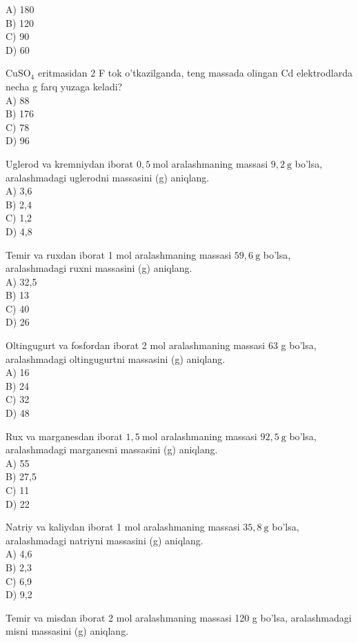 A) 180\\
B) 120\\
C) 90\\
D) 60
  \item $\mathrm{CuSO}_{4}$ eritmasidan 2 F tok o'tkazilganda, teng massada olingan Cd elektrodlarda necha g farq yuzaga keladi?\\
A) 88\\
B) 176\\
C) 78\\
D) 96
  \item Uglerod va kremniydan iborat $0,5 \mathrm{~mol}$ aralashmaning massasi $9,2 \mathrm{~g}$ bo'lsa, aralashmadagi uglerodni massasini (g) aniqlang.\\
A) 3,6\\
B) 2,4\\
C) 1,2\\
D) 4,8
  \item Temir va ruxdan iborat 1 mol aralashmaning massasi $59,6 \mathrm{~g}$ bo'lsa,\\
aralashmadagi ruxni massasini (g) aniqlang.\\
A) 32,5\\
B) 13\\
C) 40\\
D) 26
  \item Oltingugurt va fosfordan iborat 2 mol aralashmaning massasi 63 g bo'lsa, aralashmadagi oltingugurtni massasini (g) aniqlang.\\
A) 16\\
B) 24\\
C) 32\\
D) 48
  \item Rux va marganesdan iborat $1,5 \mathrm{~mol}$ aralashmaning massasi $92,5 \mathrm{~g}$ bo'lsa, aralashmadagi marganesni massasini (g) aniqlang.\\
A) 55\\
B) 27,5\\
C) 11\\
D) 22
  \item Natriy va kaliydan iborat 1 mol aralashmaning massasi $35,8 \mathrm{~g}$ bo'lsa, aralashmadagi natriyni massasini (g) aniqlang.\\
A) 4,6\\
B) 2,3\\
C) 6,9\\
D) 9,2
  \item Temir va misdan iborat 2 mol aralashmaning massasi 120 g bo'lsa, aralashmadagi misni massasini (g) aniqlang.\\
